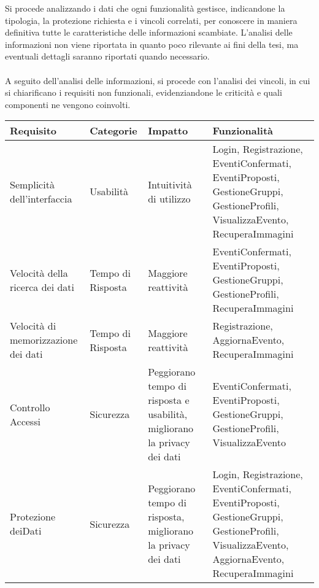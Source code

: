 Si procede analizzando i dati che ogni funzionalità gestisce, 
indicandone la tipologia, la protezione richiesta e i vincoli correlati,
per conoscere in maniera definitiva tutte le caratteristiche delle informazioni scambiate.
L'analisi delle informazioni non viene riportata in quanto poco rilevante ai fini della tesi,
ma eventuali dettagli saranno riportati quando necessario.\\
\\
A seguito dell'analisi delle informazioni, si procede con l'analisi dei vincoli,
in cui si chiarificano i requisiti non funzionali, 
evidenziandone le criticità e quali componenti ne vengono coinvolti.\\


\begin{longtable} {|P{3.5cm}|P{2cm}|P{3.5cm}|P{6cm}|}
        \hline
        \textbf{Requisito}                  & \textbf{Categorie} & \textbf{Impatto}                                                         & \textbf{Funzionalità}                                                                                                                       \\
        \hline
        \endhead
        Semplicità dell'interfaccia         & Usabilità          & Intuitività di utilizzo                                                  & Login, Registrazione, EventiConfermati, EventiProposti, GestioneGruppi, GestioneProfili, VisualizzaEvento, RecuperaImmagini                 \\
        \hline
        Velocità della ricerca dei dati     & Tempo di Risposta  & Maggiore reattività                                                      & EventiConfermati, EventiProposti, GestioneGruppi, GestioneProfili, RecuperaImmagini                                                         \\
        \hline
        Velocità di memorizzazione dei dati & Tempo di Risposta  & Maggiore reattività                                                      & Registrazione, AggiornaEvento, RecuperaImmagini                                                                                             \\
        \hline
        Controllo Accessi                   & Sicurezza          & Peggiorano tempo di risposta e usabilità, migliorano la privacy dei dati & EventiConfermati, EventiProposti, GestioneGruppi, GestioneProfili, VisualizzaEvento                                                         \\
        \hline
        Protezione dei\linebreak Dati       & Sicurezza          & Peggiorano tempo di risposta, migliorano la privacy dei dati             & Login, Registrazione, EventiConfermati, EventiProposti, GestioneGruppi, GestioneProfili, VisualizzaEvento, AggiornaEvento, RecuperaImmagini \\

\end{longtable}
